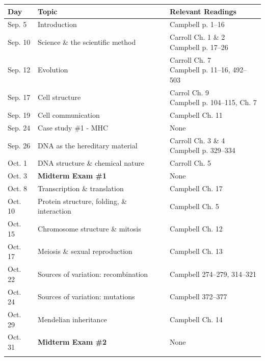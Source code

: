 \documentclass[hidelinks]{article}
\begin{document}
	\begin{table}[H]
		\footnotesize
		\centering
		\begin{tabular}{l p{6cm} p{6cm}}
			\toprule
			\textbf{Day} & \textbf{Topic} & \textbf{Relevant Readings}\\
			\midrule
			Sep. 5 & Introduction & Campbell p. 1--16\\
			\addlinespace
			Sep. 10 & Science \& the scientific method & \makecell[tl]{Carroll Ch. 1 \& 2\\ Campbell p. 17--26}\\
			\addlinespace
			Sep. 12 & Evolution & \makecell[tl]{Carroll Ch. 7\\ Campbell p. 11--16, 492--503}\\
			\addlinespace
			Sep. 17 & Cell structure & \makecell[tl]{Carrol Ch. 9\\ Campbell p. 104--115, Ch. 7}\\
			\addlinespace
			Sep. 19 & Cell communication & Campbell Ch. 11\\
			\addlinespace
			Sep. 24 & Case study \#1 - MHC & None\\
			\addlinespace
			Sep. 26 & DNA as the hereditary material & \makecell[tl]{Carroll Ch. 3 \& 4\\ Campbell p. 329--334}\\
			\addlinespace
			Oct. 1 & DNA structure \& chemical nature & Carroll Ch. 5\\
			\addlinespace
			Oct. 3 & \textbf{Midterm Exam \#1} & None \\
			\addlinespace
			Oct. 8 & Transcription \& translation & Campbell Ch. 17\\
			\addlinespace
			Oct. 10 & Protein structure, folding, \& interaction & Campbell Ch. 5\\
			\addlinespace
			Oct. 15 & Chromosome structure \& mitosis & Campbell Ch. 12\\
			\addlinespace
			Oct. 17 & Meiosis \& sexual reproduction & Campbell Ch. 13\\
			\addlinespace
			Oct. 22 & Sources of variation: recombination & Campbell 274--279, 314--321\\
			\addlinespace
			Oct. 24 & Sources of variation: mutations & Campbell 372--377\\
			\addlinespace
			Oct. 29 & Mendelian inheritance & Campbell Ch. 14\\
			\addlinespace
			Oct. 31 & \textbf{Midterm Exam \#2} & None\\
			\addlinespace

\end{tabular}
\end{table}
\end{document}
